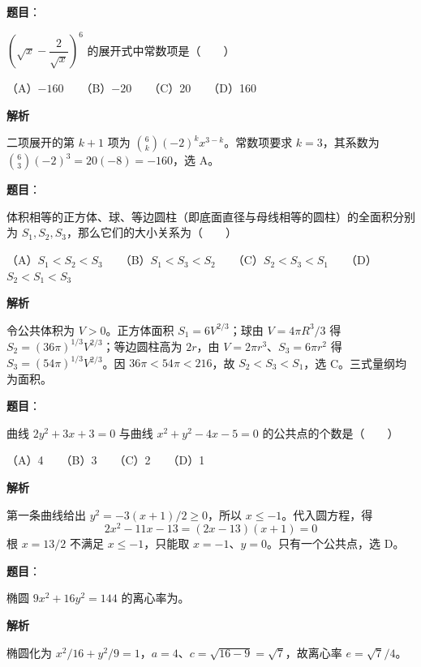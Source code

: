\begin{answer}

\textbf{题目}：

$\left(\sqrt x-\dfrac2{\sqrt x}\right)^6$ 的展开式中常数项是\mbox{（　　）}

（A）$-160$　　（B）$-20$　　（C）20　　（D）160

\textbf{解析}

二项展开的第 $k+1$ 项为 $\binom6k(-2)^k x^{3-k}$。常数项要求 $k=3$，其系数为 $\binom63(-2)^3=20(-8)=-160$，选 A。


\end{answer}
\begin{answer}

\textbf{题目}：

体积相等的正方体、球、等边圆柱（即底面直径与母线相等的圆柱）的全面积分别为 $S_1,S_2,S_3$，那么它们的大小关系为\mbox{（　　）}

（A）$S_1<S_2<S_3$　　（B）$S_1<S_3<S_2$　　（C）$S_2<S_3<S_1$　　（D）$S_2<S_1<S_3$

\textbf{解析}

令公共体积为 $V>0$。正方体面积 $S_1=6V^{2/3}$；球由 $V=4\pi R^3/3$ 得 $S_2=(36\pi)^{1/3}V^{2/3}$；等边圆柱高为 $2r$，由 $V=2\pi r^3$、$S_3=6\pi r^2$ 得 $S_3=(54\pi)^{1/3}V^{2/3}$。因 $36\pi<54\pi<216$，故 $S_2<S_3<S_1$，选 C。三式量纲均为面积。


\end{answer}
\begin{answer}

\textbf{题目}：

曲线 $2y^2+3x+3=0$ 与曲线 $x^2+y^2-4x-5=0$ 的公共点的个数是\mbox{（　　）}

（A）4　　（B）3　　（C）2　　（D）1

\textbf{解析}

第一条曲线给出 $y^2=-3(x+1)/2\ge0$，所以 $x\le-1$。代入圆方程，得
\nopagebreak[4]
\[
2x^2-11x-13=(2x-13)(x+1)=0
\]
根 $x=13/2$ 不满足 $x\le-1$，只能取 $x=-1$、$y=0$。只有一个公共点，选 D。


\end{answer}
\begin{answer}

\textbf{题目}：

椭圆 $9x^2+16y^2=144$ 的离心率为\underline{\hspace{6em}}。

\textbf{解析}

椭圆化为 $x^2/16+y^2/9=1$，$a=4$、$c=\sqrt{16-9}=\sqrt7$，故离心率 $e=\sqrt7/4$。


\end{answer}

